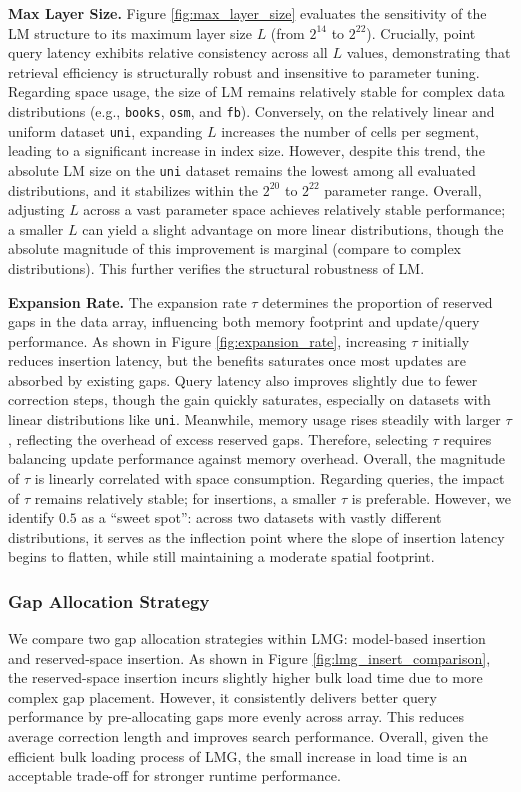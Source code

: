 \textbf{Max Layer Size.} Figure \ref{fig:max_layer_size} evaluates the sensitivity of the LM structure to its maximum layer size $\mathit{L}$ (from $2^{14}$ to $2^{22}$). Crucially, point query latency exhibits relative consistency across all $\mathit{L}$ values, demonstrating that retrieval efficiency is structurally robust and insensitive to parameter tuning. Regarding space usage, the size of LM remains relatively stable for complex data distributions (e.g., \texttt{books}, \texttt{osm}, and \texttt{fb}). Conversely, on the relatively linear and uniform dataset \texttt{uni}, expanding $\mathit{L}$ increases the number of cells per segment, leading to a significant increase in index size. However, despite this trend, the absolute LM size on the \texttt{uni} dataset remains the lowest among all evaluated distributions, and it stabilizes within the $2^{20}$ to $2^{22}$ parameter range. Overall, adjusting $\mathit{L}$ across a vast parameter space achieves relatively stable performance; a smaller $\mathit{L}$ can yield a slight advantage on more linear distributions, though the absolute magnitude of this improvement is marginal (compare to complex distributions). This further verifies the structural robustness of LM.

\textbf{Expansion Rate.} The expansion rate $\tau$ determines the proportion of reserved gaps in the data array, influencing both memory footprint and update/query performance. As shown in Figure \ref{fig:expansion_rate}, increasing $\tau$ initially reduces insertion latency, but the benefits saturates once most updates are absorbed by existing gaps. Query latency also improves slightly due to fewer correction steps, though the gain quickly saturates, especially on datasets with linear distributions like \texttt{uni}. Meanwhile, memory usage rises steadily with larger $\tau$, reflecting the overhead of excess reserved gaps. Therefore, selecting $\tau$ requires balancing update performance against memory overhead. Overall, the magnitude of $\tau$ is linearly correlated with space consumption. Regarding queries, the impact of $\tau$ remains relatively stable; for insertions, a smaller $\tau$ is preferable. However, we identify $0.5$ as a ``sweet spot'': across two datasets with vastly different distributions, it serves as the inflection point where the slope of insertion latency begins to flatten, while still maintaining a moderate spatial footprint.

\subsubsection{Gap Allocation Strategy}
We compare two gap allocation strategies within LMG: model-based insertion \cite{alex20} and reserved-space insertion. As shown in Figure \ref{fig:lmg_insert_comparison}, the reserved-space insertion incurs slightly higher bulk load time due to more complex gap placement. However, it consistently delivers better query performance by pre-allocating gaps more evenly across array. This reduces average correction length and improves search performance. Overall, given the efficient bulk loading process of LMG, the small increase in load time is an acceptable trade-off for stronger runtime performance.

